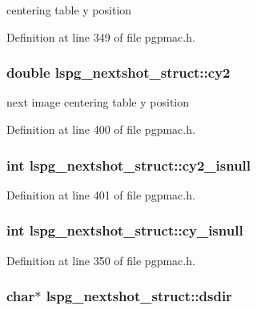 centering table y position 



Definition at line 349 of file pgpmac.\-h.

\hypertarget{structlspg__nextshot__struct_a3644e5c3f12af18a3b426d4d4d7e16a5}{
\subsubsection[{cy2}]{\setlength{\rightskip}{0pt plus 5cm}double lspg\-\_\-nextshot\-\_\-struct\-::cy2}}\label{structlspg__nextshot__struct_a3644e5c3f12af18a3b426d4d4d7e16a5}


next image centering table y position 



Definition at line 400 of file pgpmac.\-h.

\hypertarget{structlspg__nextshot__struct_a57d78a389413827302df6ebe3dcb3c89}{
\subsubsection[{cy2\-\_\-isnull}]{\setlength{\rightskip}{0pt plus 5cm}int lspg\-\_\-nextshot\-\_\-struct\-::cy2\-\_\-isnull}}\label{structlspg__nextshot__struct_a57d78a389413827302df6ebe3dcb3c89}


Definition at line 401 of file pgpmac.\-h.

\hypertarget{structlspg__nextshot__struct_a3895d645420848aed05b95694ec8c6c7}{
\subsubsection[{cy\-\_\-isnull}]{\setlength{\rightskip}{0pt plus 5cm}int lspg\-\_\-nextshot\-\_\-struct\-::cy\-\_\-isnull}}\label{structlspg__nextshot__struct_a3895d645420848aed05b95694ec8c6c7}


Definition at line 350 of file pgpmac.\-h.

\hypertarget{structlspg__nextshot__struct_ac372e1774a25b3d4bfbb9169762eb39e}{
\subsubsection[{dsdir}]{\setlength{\rightskip}{0pt plus 5cm}char$\ast$ lspg\-\_\-nextshot\-\_\-struct\-::dsdir}}\label{structlspg__nextshot__struct_ac372e1774a25b3d4bfbb9169762eb39e}


